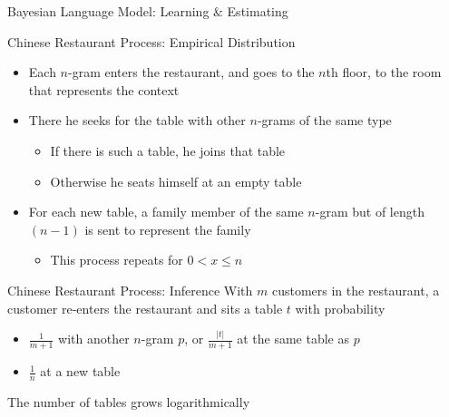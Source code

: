 \begin{frame}{Bayesian Language Model: Learning \& Estimating}
    \begin{block}{Chinese Restaurant Process: Empirical Distribution}
        \begin{itemize}
            \item Each $n$-gram enters the restaurant, and goes to the $n$th floor, to the room that represents the context
            \item There he seeks for the table with other $n$-grams of the same type
                \begin{itemize}
                    \item If there is such a table, he joins that table
                    \item Otherwise he seats himself at an empty table
                \end{itemize}
            \item For each new table, a family member of the same $n$-gram but of length $(n-1)$ is sent to represent the family
                \begin{itemize}
                    \item This process repeats for $0 < x \leq n$
                \end{itemize}
        \end{itemize}
    \end{block}

    \begin{block}{Chinese Restaurant Process: Inference}
        With $m$ customers in the restaurant, a customer re-enters the restaurant and sits a table $t$ with probability
        \begin{itemize}
            \item $\frac{1}{m+1}$ with another $n$-gram $p$, or $\frac{|t|}{m+1}$ at the same table as $p$
            \item $\frac{1}{n}$ at a new table
        \end{itemize}
        The number of tables grows logarithmically
    \end{block}
\end{frame}

